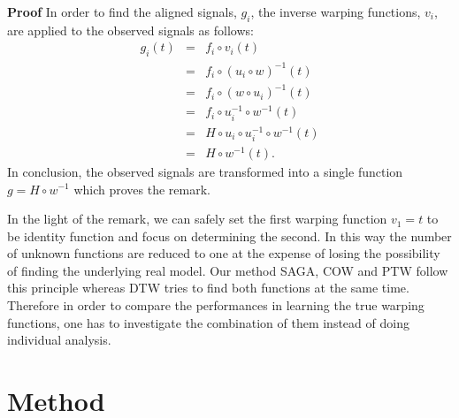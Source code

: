 \documentclass[number,1p,12pt]{elsarticle}
\begin{document}
{\bf Proof }
In order to find the aligned signals, $g_i$, the inverse warping functions, $v_i$, are applied to the observed signals as follows:
\begin{eqnarray}
g_i(t)                 & = & f_i  \circ v_i(t) \nonumber\\
                         & = & f_i  \circ (u_i \circ w)^{-1}(t) \nonumber\\
                         & = & f_i  \circ (w \circ u_i)^{-1}(t) \nonumber\\
                         & = & f_i  \circ u_i^{-1}\circ w^{-1}(t) \nonumber\\
                         & = & H\circ u_i \circ u_i^{-1}\circ w^{-1}(t) \nonumber\\
                         & = & H\circ w^{-1}(t). 
\end{eqnarray}
In conclusion, the observed signals are transformed into a single function $g = H\circ w^{-1}$ which proves the remark.

In the light of the remark, we can safely set the first warping function $v_1=t$ to be identity function and focus on determining the second. In this way the number of unknown functions are reduced to one at the expense of losing the possibility of finding the underlying real model. Our method SAGA, COW and PTW follow this principle whereas DTW tries to find both functions at the same time. Therefore in order to compare the performances in learning the true warping functions, one has to investigate the combination of them instead of doing individual analysis.

\section{Method}
\end{document}
